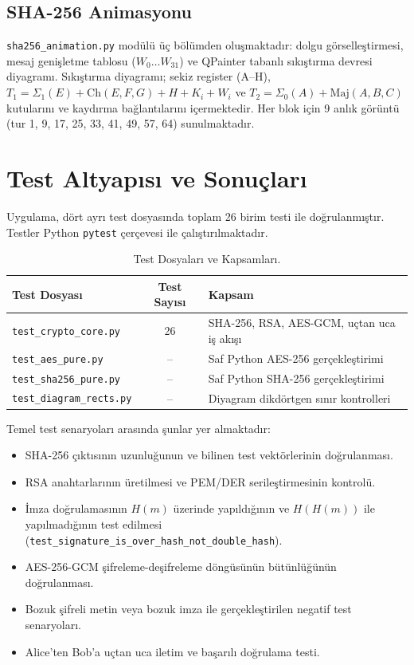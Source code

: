 \subsection{SHA-256 Animasyonu}

\texttt{sha256\_animation.py} modülü üç bölümden oluşmaktadır: dolgu görselleştirmesi, mesaj genişletme tablosu ($W_0 \ldots W_{31}$) ve QPainter tabanlı sıkıştırma devresi diyagramı. Sıkıştırma diyagramı; sekiz register (A–H), $T_1 = \Sigma_1(E) + \text{Ch}(E,F,G) + H + K_i + W_i$ ve $T_2 = \Sigma_0(A) + \text{Maj}(A,B,C)$ kutularını ve kaydırma bağlantılarını içermektedir. Her blok için 9 anlık görüntü (tur 1, 9, 17, 25, 33, 41, 49, 57, 64) sunulmaktadır.

\section{Test Altyapısı ve Sonuçları}

Uygulama, dört ayrı test dosyasında toplam 26 birim testi ile doğrulanmıştır. Testler Python \texttt{pytest} çerçevesi ile çalıştırılmaktadır.

\begin{table}[t]
	\caption{Test Dosyaları ve Kapsamları.}
	\centering
	\begin{tabular}{|l|c|l|}
		\hline \textbf{Test Dosyası} & \textbf{Test Sayısı} & \textbf{Kapsam} \\
		\hline \texttt{test\_crypto\_core.py} & 26 & SHA-256, RSA, AES-GCM, uçtan uca iş akışı \\
		\hline \texttt{test\_aes\_pure.py} & -- & Saf Python AES-256 gerçekleştirimi \\
		\hline \texttt{test\_sha256\_pure.py} & -- & Saf Python SHA-256 gerçekleştirimi \\
		\hline \texttt{test\_diagram\_rects.py} & -- & Diyagram dikdörtgen sınır kontrolleri \\
		\hline
	\end{tabular}
	\label{tab:Testler}
\end{table}

Temel test senaryoları arasında şunlar yer almaktadır:

\begin{itemize}
    \item SHA-256 çıktısının uzunluğunun ve bilinen test vektörlerinin doğrulanması.
    \item RSA anahtarlarının üretilmesi ve PEM/DER serileştirmesinin kontrolü.
    \item İmza doğrulamasının $H(m)$ üzerinde yapıldığının ve $H(H(m))$ ile yapılmadığının test edilmesi (\texttt{test\_signature\_is\_over\_hash\_not\_double\_hash}).
    \item AES-256-GCM şifreleme-deşifreleme döngüsünün bütünlüğünün doğrulanması.
    \item Bozuk şifreli metin veya bozuk imza ile gerçekleştirilen negatif test senaryoları.
    \item Alice'ten Bob'a uçtan uca iletim ve başarılı doğrulama testi.
\end{itemize}

\clearpage
